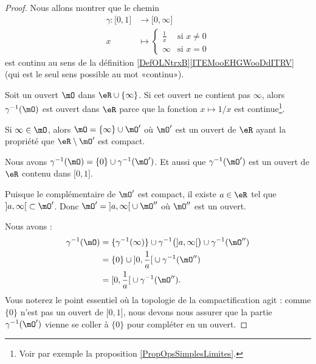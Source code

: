 \begin{proof}
	Nous allons montrer que le chemin
	\begin{equation}
		\begin{aligned}
			\gamma\colon \mathopen[ 0 , 1 \mathclose] & \to \mathopen[ 0 , \infty \mathclose] \\
			x                                         & \mapsto \begin{cases}
				\frac{1}{ x } & \text{si } x\neq 0 \\
				\infty        & \text{si } x=0
			\end{cases}
		\end{aligned}
	\end{equation}
	est continu au sens de la définition \ref{DefOLNtrxB}\ref{ITEMooEHGWooDdITRV} (qui est le seul sens possible au mot «continu»).

	Soit un ouvert \( \mO\) dans \( \eR\cup\{ \infty \}\). Si cet ouvert ne contient pas \( \infty\), alors \( \gamma^{-1}(\mO)\) est ouvert dans \( \eR\) parce que la fonction \( x\mapsto 1/x\) est continue\footnote{Voir par exemple la proposition \ref{PropOpsSimplesLimites}.}.

	Si \( \infty\in\mO\), alors \( \mO=\{ \infty \}\cup \mO'\) où \( \mO'\) est un ouvert de \( \eR\) ayant la propriété que \( \eR\setminus \mO'\) est compact.

	Nous avons \( \gamma^{-1}(\mO)=\{ 0 \}\cup\gamma^{-1}(\mO')\). Et aussi que \( \gamma^{-1}(\mO')\) est un ouvert de \( \eR\) contenu dans \( \mathopen[ 0 , 1 \mathclose]\).

	Puisque le complémentaire de \( \mO'\) est compact, il existe \( a\in \eR\) tel que \( \mathopen] a , \infty \mathclose[\subset \mO'\). Donc \( \mO'=\mathopen] a , \infty \mathclose[\cup\mO''\) où \( \mO''\) est un ouvert.

	Nous avons :
	\begin{subequations}
		\begin{align}
			\gamma^{-1}(\mO) & =\{ \gamma^{-1}(\infty) \}\cup \gamma^{-1}\big( \mathopen] a , \infty \mathclose[ \big)\cup \gamma^{-1}(\mO'') \\
			                 & =\{ 0 \}\cup\mathopen] 0 , \frac{1}{  a } \mathclose[\cup\gamma^{-1}(\mO'')                                    \\
			                 & =\mathopen[ 0 , \frac{1}{ a } \mathclose[\cup\gamma^{-1}(\mO'').
		\end{align}
	\end{subequations}
	Vous noterez le point essentiel où la topologie de la compactification agit : comme \( \{0\}\) n'est pas un ouvert de \( \mathopen[ 0 , 1 \mathclose]\), nous devons nous assurer que la partie \( \gamma^{-1}(\mO')\) vienne se coller à \( \{0\}\) pour compléter en un ouvert.


\end{proof}
